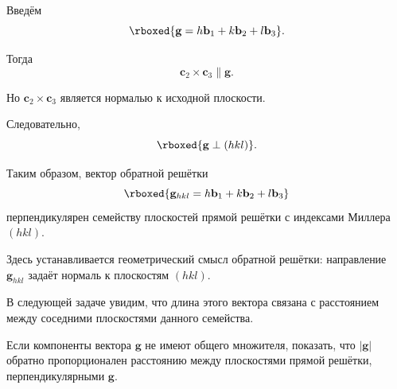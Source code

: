 \documentclass[../final.tex]{subfiles}
\begin{document}
Введём
%
\begin{equation*}
    \rboxed{
        \mathbf g
        =
        h\mathbf b_1
        +
        k\mathbf b_2
        +
        l\mathbf b_3
    }.
\end{equation*}

Тогда
%
\begin{equation*}
    \mathbf c_2\times\mathbf c_3
    \parallel
    \mathbf g.
\end{equation*}

Но $\mathbf c_2\times\mathbf c_3$ является нормалью
к исходной плоскости.

Следовательно,
%
\begin{equation*}
    \rboxed{
        \mathbf g\perp(hkl)
    }.
\end{equation*}

Таким образом, вектор обратной решётки
%
\begin{equation*}
    \rboxed{
        \mathbf g_{hkl}
        =
        h\mathbf b_1
        +
        k\mathbf b_2
        +
        l\mathbf b_3
    }
\end{equation*}
%
перпендикулярен семейству плоскостей прямой решётки
с индексами Миллера $(hkl)$.

\remark[Комментарий.]
Здесь устанавливается геометрический смысл обратной решётки:
направление $\mathbf g_{hkl}$ задаёт нормаль к плоскостям
$(hkl)$.

В следующей задаче увидим, что длина этого вектора связана
с расстоянием между соседними плоскостями данного семейства.




\condition
Если компоненты вектора $\mathbf g$ не имеют общего множителя,
показать, что $|\mathbf g|$ обратно пропорционален расстоянию
между плоскостями прямой решётки, перпендикулярными
$\mathbf g$.


%
%
\end{document}
